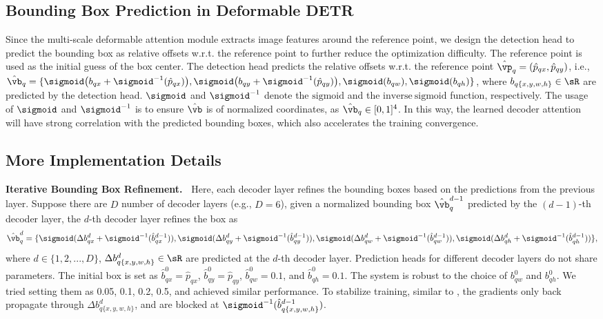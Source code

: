 \subsection{Bounding Box Prediction in Deformable DETR}
\label{sec:bbox_pred}

Since the multi-scale deformable attention module extracts image features around the reference point, we design the detection head to predict the bounding box as relative offsets w.r.t. the reference point to further reduce the optimization difficulty. The reference point is used as the initial guess of the box center. The detection head predicts the relative offsets w.r.t. the reference point $\hat{\vp}_q = (\hat{p}_{qx}, \hat{p}_{qy})$, i.e., $\hat{\vb}_q = \{\sigmoid\big({b}_{qx} + \sigmoid^{-1}(\hat{p}_{qx})\big), \sigmoid\big({b}_{qy} + \sigmoid^{-1}(\hat{p}_{qy})\big), \sigmoid({b}_{qw}), \sigmoid({b}_{qh})\}$, where ${b}_{q\{x,y,w,h\}} \in \sR $ are predicted by the detection head. $\sigmoid$ and $\sigmoid^{-1}$ denote the $\mathrm{sigmoid}$ and the $\mathrm{inverse~sigmoid}$ function, respectively. The usage of $\sigmoid$ and $\sigmoid^{-1}$ is to ensure $\hat{\vb}$ is of normalized coordinates, as $\hat{\vb}_q \in [0, 1]^4$.
In this way, the learned decoder attention will have strong correlation with the predicted bounding boxes, which also accelerates the training convergence.


\subsection{More Implementation Details}
\label{sec:imp_details}

\textbf{Iterative Bounding Box Refinement.~}
Here, each decoder layer refines the bounding boxes based on the predictions from the previous layer. Suppose there are $D$ number of decoder layers (e.g., $D = 6$), given a normalized bounding box $\hat{\vb}_q^{d-1}$ predicted by the $(d-1)$-th decoder layer, the $d$-th decoder layer refines the box as 
\begin{equation*}
\hat{\vb}^d_q = \{\sigmoid(\Delta b^d_{qx} + \sigmoid^{-1}(\hat{b}^{d-1}_{qx})), \sigmoid(\Delta b^d_{qy} + \sigmoid^{-1}(\hat{b}^{d-1}_{qy})), \sigmoid(\Delta b^d_{qw} + \sigmoid^{-1}(\hat{b}^{d-1}_{qw})), \sigmoid(\Delta b^d_{qh} + \sigmoid^{-1}(\hat{b}^{d-1}_{qh}))\},
\end{equation*}
where $d \in \{1, 2, ..., D\}$, $\Delta b^d_{q\{x,y,w,h\}} \in \sR$ are predicted at the $d$-th decoder layer. Prediction heads for different decoder layers do not share parameters. The initial box is set as $\hat{b}^0_{qx} = \hat{p}_{qx}$, $\hat{b}^0_{qy} = \hat{p}_{qy}$, $\hat{b}^0_{qw} = 0.1$, and $\hat{b}^0_{qh} = 0.1$. The system is robust to the choice of $b^0_{qw}$ and $b^0_{qh}$. We tried setting them as 0.05, 0.1, 0.2, 0.5, and achieved similar performance. To stabilize training, similar to \citet{teed2020raft}, the gradients only back propagate through $\Delta b^d_{q\{x,y,w,h\}}$, and are blocked at $\sigmoid^{-1}(\hat{b}^{d-1}_{q\{x,y,w,h\}})$.

